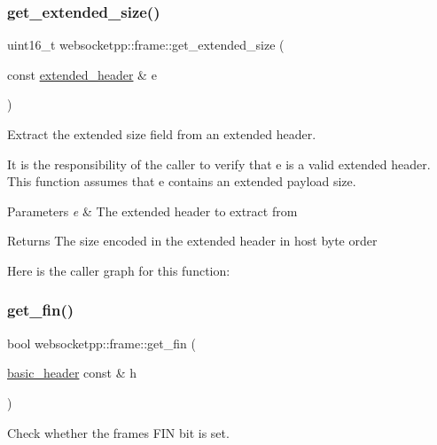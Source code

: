 \subsubsection{\texorpdfstring{get\+\_\+extended\+\_\+size()}{get\_extended\_size()}}
{\footnotesize\ttfamily uint16\+\_\+t websocketpp\+::frame\+::get\+\_\+extended\+\_\+size (\begin{DoxyParamCaption}\item[{const \mbox{\hyperlink{structwebsocketpp_1_1frame_1_1extended__header}{extended\+\_\+header}} \&}]{e }\end{DoxyParamCaption})\hspace{0.3cm}{\ttfamily [inline]}}



Extract the extended size field from an extended header. 

It is the responsibility of the caller to verify that e is a valid extended header. This function assumes that e contains an extended payload size.


\begin{DoxyParams}{Parameters}
{\em e} & The extended header to extract from\\
\hline
\end{DoxyParams}
\begin{DoxyReturn}{Returns}
The size encoded in the extended header in host byte order 
\end{DoxyReturn}
Here is the caller graph for this function\+:
\mbox{\label{namespacewebsocketpp_1_1frame_a66b39e273681d8509128e420cfaef6b0}} 
\subsubsection{\texorpdfstring{get\+\_\+fin()}{get\_fin()}}
{\footnotesize\ttfamily bool websocketpp\+::frame\+::get\+\_\+fin (\begin{DoxyParamCaption}\item[{\mbox{\hyperlink{structwebsocketpp_1_1frame_1_1basic__header}{basic\+\_\+header}} const \&}]{h }\end{DoxyParamCaption})\hspace{0.3cm}{\ttfamily [inline]}}



Check whether the frame\textquotesingle{}s F\+IN bit is set. 


